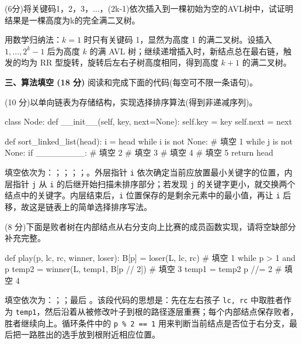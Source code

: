 \begin{question}
(6分)将关键码1，2，3，...，(2k-1)依次插入到一棵初始为空的AVL树中，试证明结果是一棵高度为k的完全满二叉树。
\begin{solution}
用数学归纳法：$k=1$ 时只有关键码 1，显然为高度 1 的满二叉树。设插入 $1,\ldots,2^k-1$ 后为高度 $k$ 的满 AVL 树；继续递增插入时，新结点总在最右链，触发的均为 RR 型旋转，旋转后左右子树高度相同，得到高度 $k+1$ 的满二叉树。
\end{solution}
\end{question}

\textbf{三、算法填空 (18 分)}
阅读和完成下面的代码(每空可不限一条语句)。
\begin{question}
(10 分)以单向链表为存储结构，实现选择排序算法(得到非递减序列)。
\begin{pycode}
class Node:
    def __init__(self, key, next=None):
        self.key = key
        self.next = next


def sort_linked_list(head):
    i = head
    while i is not None:
        # 填空 1
        while j is not None:
            if ________:        # 填空 2
                # 填空 3
            # 填空 4
        # 填空 5
    return head
\end{pycode}
\begin{solution}
填空依次为：\texttt{}；\texttt{}；\texttt{}；\texttt{}；\texttt{}。外层指针 \texttt{i} 依次确定当前应放置最小关键字的位置，内层指针 \texttt{j} 从 \texttt{i} 的后继开始扫描未排序部分；若发现 \texttt{j} 的关键字更小，就交换两个结点中的关键字。内层结束后，\texttt{i} 位置保存的是剩余元素中的最小值，再让 \texttt{i} 后移，故这是链表上的简单选择排序写法。
\end{solution}
\end{question}

\begin{question}
(8 分)下面是败者树在内部结点从右分支向上比赛的成员函数实现，请将空缺部分补充完整。
\begin{pycode}
def play(p, lc, rc, winner, loser):
    B[p] = loser(L, lc, rc)
    # 填空 1
    while p > 1 and p %
        temp2 = winner(L, temp1, B[p // 2])
        # 填空 3
        temp1 = temp2
        p //= 2
    # 填空 4
\end{pycode}
\begin{solution}
填空依次为：\texttt{}；\texttt{}；最后 \texttt{}。该段代码的思想是：先在左右孩子 \texttt{lc, rc} 中取胜者作为 \texttt{temp1}，然后沿着从被修改叶子到根的路径逐层重赛；每个内部结点保存败者，胜者继续向上。循环条件中的 \texttt{p \% 2 == 1} 用来判断当前结点是否位于右分支，最后把一路胜出的选手放到根附近相应位置。
\end{solution}
\end{question}


